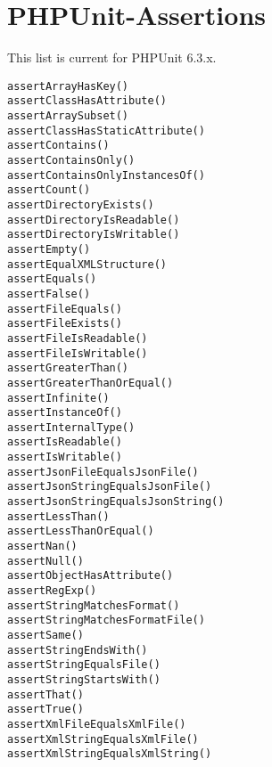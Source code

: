 \documentclass[a4paper,11pt,headsepline]{scrartcl}
\begin{document}
\pagebreak
\section{PHPUnit-Assertions}
This list is current for PHPUnit 6.3.x.

\begin{verbatim}
assertArrayHasKey()
assertClassHasAttribute()
assertArraySubset()
assertClassHasStaticAttribute()
assertContains()
assertContainsOnly()
assertContainsOnlyInstancesOf()
assertCount()
assertDirectoryExists()
assertDirectoryIsReadable()
assertDirectoryIsWritable()
assertEmpty()
assertEqualXMLStructure()
assertEquals()
assertFalse()
assertFileEquals()
assertFileExists()
assertFileIsReadable()
assertFileIsWritable()
assertGreaterThan()
assertGreaterThanOrEqual()
assertInfinite()
assertInstanceOf()
assertInternalType()
assertIsReadable()
assertIsWritable()
assertJsonFileEqualsJsonFile()
assertJsonStringEqualsJsonFile()
assertJsonStringEqualsJsonString()
assertLessThan()
assertLessThanOrEqual()
assertNan()
assertNull()
assertObjectHasAttribute()
assertRegExp()
assertStringMatchesFormat()
assertStringMatchesFormatFile()
assertSame()
assertStringEndsWith()
assertStringEqualsFile()
assertStringStartsWith()
assertThat()
assertTrue()
assertXmlFileEqualsXmlFile()
assertXmlStringEqualsXmlFile()
assertXmlStringEqualsXmlString()
\end{verbatim}


\end{document}
